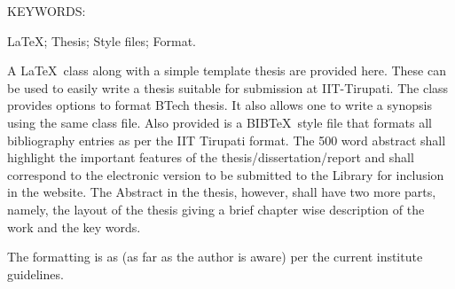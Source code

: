 
\abstract

\noindent KEYWORDS: \hspace*{0.5em} \parbox[t]{4.4in}{\LaTeX ; Thesis;
  Style files; Format.}

\vspace*{24pt}

\noindent A \LaTeX\ class along with a simple template thesis are
provided here.  These can be used to easily write a thesis suitable
for submission at IIT-Tirupati.  The class provides options to format
BTech thesis.  It also allows one to write a
synopsis using the same class file.  Also provided is a BIB\TeX\ style
file that formats all bibliography entries as per the IIT Tirupati format.
The 500 word abstract shall highlight the important features of the
thesis/dissertation/report and shall correspond to the electronic version to be submitted to the
Library for inclusion in the website. The Abstract in the thesis, however, shall have two more
parts, namely, the layout of the thesis giving a brief chapter wise description of the work and
the key words.

The formatting is as (as far as the author is aware) per the current
institute guidelines. 